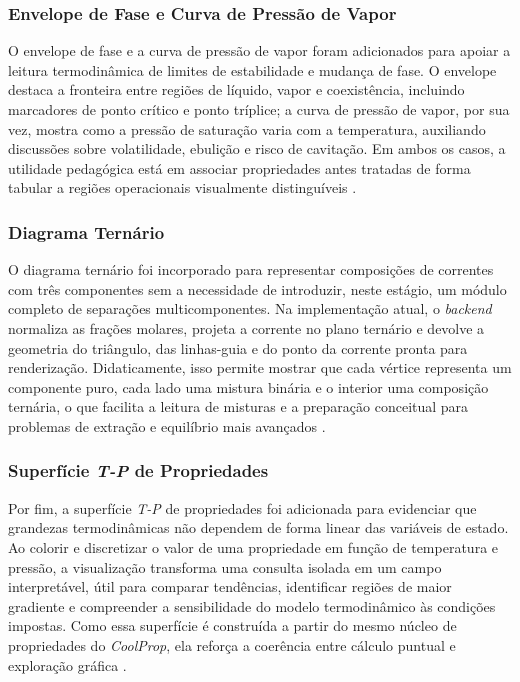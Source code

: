 \subsubsection{Envelope de Fase e Curva de Pressão de Vapor}

O envelope de fase e a curva de pressão de vapor foram adicionados para apoiar a leitura termodinâmica de limites de estabilidade e mudança de fase. O envelope destaca a fronteira entre regiões de líquido, vapor e coexistência, incluindo marcadores de ponto crítico e ponto tríplice; a curva de pressão de vapor, por sua vez, mostra como a pressão de saturação varia com a temperatura, auxiliando discussões sobre volatilidade, ebulição e risco de cavitação. Em ambos os casos, a utilidade pedagógica está em associar propriedades antes tratadas de forma tabular a regiões operacionais visualmente distinguíveis \cite{poling2001,smith2018}.

\subsubsection{Diagrama Ternário}

O diagrama ternário foi incorporado para representar composições de correntes com três componentes sem a necessidade de introduzir, neste estágio, um módulo completo de separações multicomponentes. Na implementação atual, o \textit{backend} normaliza as frações molares, projeta a corrente no plano ternário e devolve a geometria do triângulo, das linhas-guia e do ponto da corrente pronta para renderização. Didaticamente, isso permite mostrar que cada vértice representa um componente puro, cada lado uma mistura binária e o interior uma composição ternária, o que facilita a leitura de misturas e a preparação conceitual para problemas de extração e equilíbrio mais avançados \cite{seader2016,devoe2014}.

\subsubsection{Superfície \textit{T-P} de Propriedades}

Por fim, a superfície \textit{T-P} de propriedades foi adicionada para evidenciar que grandezas termodinâmicas não dependem de forma linear das variáveis de estado. Ao colorir e discretizar o valor de uma propriedade em função de temperatura e pressão, a visualização transforma uma consulta isolada em um campo interpretável, útil para comparar tendências, identificar regiões de maior gradiente e compreender a sensibilidade do modelo termodinâmico às condições impostas. Como essa superfície é construída a partir do mesmo núcleo de propriedades do \textit{CoolProp}, ela reforça a coerência entre cálculo puntual e exploração gráfica \cite{bell2014,poling2001}.

